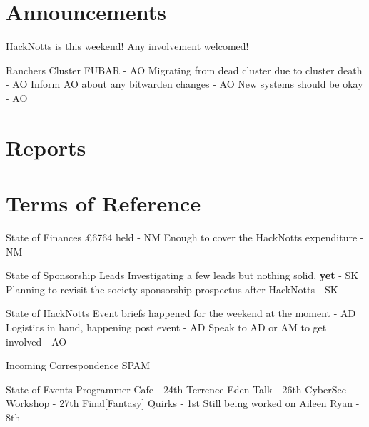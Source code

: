 \documentclass[11pt,hacksoc]{meetingmins}
\begin{document}
\maketitle

\section{Announcements}
\begin{items}
\item HackNotts is this weekend!
\subitem Any involvement welcomed!
\item Ranchers Cluster FUBAR - AO
\subitem Migrating from dead cluster due to cluster death - AO
\subitem Inform AO about any bitwarden changes - AO
\subitem New systems should be okay - AO 
\end{items}

\section{Reports}


\section{Terms of Reference}
\begin{items}
\item {State of Finances}
\subitem £6764 held - NM
\subitem Enough to cover the HackNotts expenditure - NM
\item {State of Sponsorship Leads}
\subitem Investigating a few leads but nothing solid, \textbf{yet} - SK
\subitem Planning to revisit the society sponsorship prospectus after HackNotts - SK
\item {State of HackNotts}
\subitem Event briefs happened for the weekend at the moment - AD
\subitem Logistics in hand, happening post event - AD
\subitem Speak to AD or AM to get involved - AO
\item {Incoming Correspondence}
\subitem SPAM
\item {State of Events}
\subitem Programmer Cafe - 24th
\subitem Terrence Eden Talk - 26th
\subitem CyberSec Workshop - 27th
\subitem Final[Fantasy] Quirks - 1st 
\subsubitem Still being worked on
\subitem Aileen Ryan - 8th
\end{items}
\end{document}
